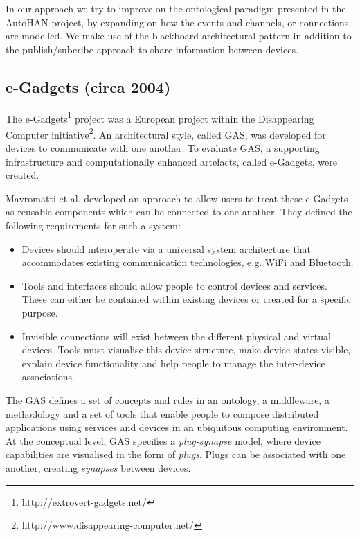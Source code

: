 In our approach we try to improve on the ontological paradigm presented in the AutoHAN project, by expanding on how the events and channels, or connections, are modelled. We make use of the blackboard architectural pattern in addition to the publish/subcribe approach to share information between devices. 


\subsection{e-Gadgets (circa 2004)}
\label{egadgets}

The e-Gadgets\footnote{http://extrovert-gadgets.net/} project was a European project within the Disappearing Computer initiative\footnote{http://www.disappearing-computer.net/}. An architectural style, called \ac{GAS}, was developed for devices to communicate with one another. To evaluate \ac{GAS}, a supporting infrastructure and computationally enhanced artefacts, called e-Gadgets, were created.

Mavromatti et al. \cite{Mavrommati2004} developed an approach to allow users to treat these e-Gadgets as reusable components which can be connected to one another. They defined the following requirements for such a system:

\begin{itemize}
	\item Devices should interoperate via a universal system architecture that accommodates existing communication technologies, e.g. WiFi and Bluetooth.
	\item Tools and interfaces should allow people to control devices and services. These can either be contained within existing devices or created for a specific purpose.
	\item Invisible connections will exist between the different physical and virtual devices. Tools must visualise this device structure, make device states visible, explain device functionality and help people to manage the inter-device associations.
\end{itemize}

The \ac{GAS} defines a set of concepts and rules in an ontology, a middleware, a methodology and a set of tools that enable people to compose distributed applications using services and devices in an ubiquitous computing environment. At the conceptual level, \ac{GAS} specifies a \emph{plug-synapse} model, where device capabilities are visualised in the form of \emph{plugs}. Plugs can be associated with one another, creating \emph{synapses} between devices.

